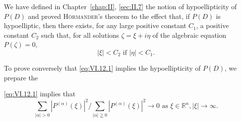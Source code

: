 \label{sec:VI.12}

We have defined in Chapter~\ref{chap:II}, \ref{sec:II.7} the notion of hypoellipticity of $P(D)$ and proved \textsc{Hörmander}'s theorem to the effect that, if $P(D)$ is hypoelliptic, then there exists, for any large positive constant $C_1$, a positive constant $C_2$ such that, for all solutions $\zeta = \xi + i\eta$ of the algebraic equation $P(\zeta) = 0$, 
\begin{equation}\label{eq:VI.12.1}
| \xi | < C _{2} \text{ if } | \eta | < C _{1}.
\end{equation}

To prove conversely that \eqref{eq:VI.12.1} implies the hypoellipticity of $P(D)$, we prepare the 

\begin{lemman} \eqref{eq:VI.12.1} implies that 
\begin{equation}\label{eq:VI.12.2}
\sum\limits_{| \alpha | > 0} \left| P ^{(\alpha)} (\xi) \right| ^{2} / \sum\limits_{| \alpha | \geqq 0} \left| P ^{(\alpha)} (\xi) \right| ^{2} \rightarrow 0 \text{ as } \xi \in \mathbb{R}^{n}, | \xi | \rightarrow \infty .
\end{equation}
\end{lemman}

